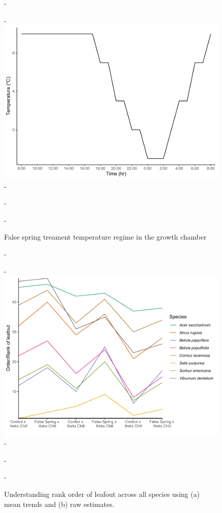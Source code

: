 \documentclass{article}\usepackage[]{graphicx}\usepackage[]{color}
\begin{document}
\begin{enumerate}
{\begin{figure} [H]
  -\begin{center}
  -\includegraphics[width=12cm]{..//analyses/figures/growthchamber.pdf}
  -\caption{False spring treament temperature regime in the growth chamber}\label{fig:gccond}
  -\end{center}
  -\end{figure}}

  {\begin{figure} [H]
  -\begin{center}
  -\includegraphics[width=12cm]{..//analyses/figures/leafoutorder_byrank.pdf} 
  -\caption{Understanding rank order of leafout across all species using (a) mean trends and (b) raw estimates. }\label{fig:rank}
  -\end{center}
  -\end{figure}}
  

\end{enumerate}
\end{document}
